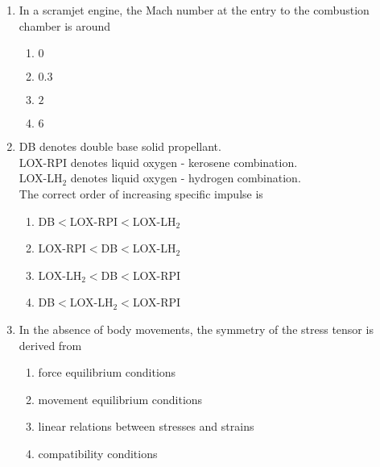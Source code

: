 \documentclass[journal]{IEEEtran}
\begin{document}
\begin{enumerate}
    \item In a scramjet engine, the Mach number at the entry to the combustion chamber is around

        \begin{multicols}{4}
            \begin{enumerate}
                \item $0$
                \item $0.3$
                \item $2$
                \item $6$
            \end{enumerate}
        \end{multicols}

    \item DB denotes double base solid propellant.\\
    LOX-RPI denotes liquid oxygen - kerosene combination.\\
    LOX-LH$_2$ denotes liquid oxygen - hydrogen combination.\\

    The correct order of increasing specific impulse is 

        \begin{multicols}{2}
            \begin{enumerate}
                \item DB$<$LOX-RPI$<$LOX-LH$_2$
                \item LOX-RPI$<$DB$<$LOX-LH$_2$
                \item LOX-LH$_2<$DB$<$LOX-RPI
                \item DB$<$LOX-LH$_2<$LOX-RPI
            \end{enumerate}
        \end{multicols}

    \item In the absence of body movements, the symmetry of the stress tensor is derived from

        \begin{enumerate}
            \item force equilibrium conditions
            \item movement equilibrium conditions
            \item linear relations between stresses and strains
            \item compatibility conditions
        \end{enumerate}


\end{enumerate}
\end{document}
